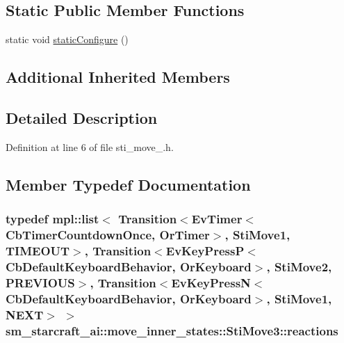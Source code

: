 \subsection*{Static Public Member Functions}
\begin{DoxyCompactItemize}
\item 
static void \hyperlink{structsm__starcraft__ai_1_1move__inner__states_1_1StiMove3_a40a677f56bfc7db23de87d05ef8f39bf}{static\+Configure} ()
\end{DoxyCompactItemize}
\subsection*{Additional Inherited Members}


\subsection{Detailed Description}


Definition at line 6 of file sti\+\_\+move\+\_.\+h.



\subsection{Member Typedef Documentation}
\subsubsection[{\texorpdfstring{reactions}{reactions}}]{\setlength{\rightskip}{0pt plus 5cm}typedef mpl\+::list$<$ Transition$<$Ev\+Timer$<$Cb\+Timer\+Countdown\+Once, {\bf Or\+Timer}$>$, {\bf Sti\+Move1}, {\bf T\+I\+M\+E\+O\+UT}$>$, Transition$<$Ev\+Key\+PressP$<$Cb\+Default\+Keyboard\+Behavior, {\bf Or\+Keyboard}$>$, {\bf Sti\+Move2}, {\bf P\+R\+E\+V\+I\+O\+US}$>$, Transition$<$Ev\+Key\+PressN$<$Cb\+Default\+Keyboard\+Behavior, {\bf Or\+Keyboard}$>$, {\bf Sti\+Move1}, {\bf N\+E\+XT}$>$ $>$ {\bf sm\+\_\+starcraft\+\_\+ai\+::move\+\_\+inner\+\_\+states\+::\+Sti\+Move3\+::reactions}}\hypertarget{structsm__starcraft__ai_1_1move__inner__states_1_1StiMove3_a80a8cb4c25b8e2a44e50da48373cb72c}{}\label{structsm__starcraft__ai_1_1move__inner__states_1_1StiMove3_a80a8cb4c25b8e2a44e50da48373cb72c}


